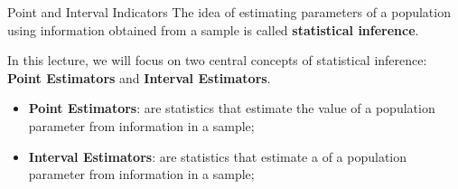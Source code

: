 \begin{frame}{Point and Interval Indicators}
  The idea of estimating parameters of a population using information
  obtained from a sample is called {\bf statistical inference}.
  \bigskip

  In this lecture, we will focus on two central concepts of statistical inference: {\bf Point Estimators} and {\bf Interval Estimators}.\bigskip

  \begin{itemize}
    \item {\bf Point Estimators}: are statistics that estimate the value of a population parameter from information in a sample;

    \item {\bf Interval Estimators}: are statistics that estimate a  of a population parameter from information in a sample;
  \end{itemize}
\end{frame}

